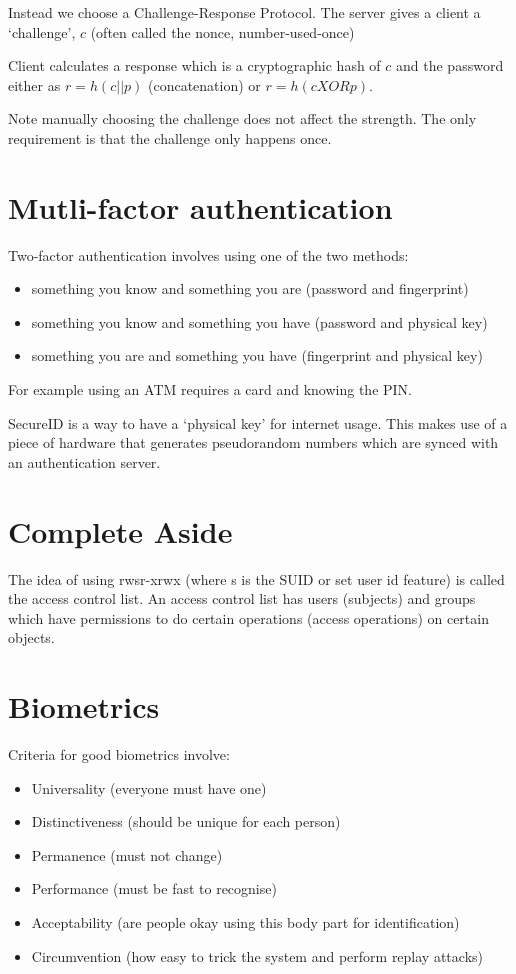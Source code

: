 \documentclass{report}
\begin{document}
Instead we choose a Challenge-Response Protocol.
The server gives a client a `challenge', $c$
(often called the nonce, number-used-once)

Client calculates a response which is a cryptographic hash of $c$
and the password
either as $r = h(c||p)$ (concatenation) or $r = h(c XOR p)$.

Note manually choosing the challenge does not affect the strength. The only
requirement is that the challenge only happens once.

\section{Mutli-factor authentication}
Two-factor authentication involves using one of the two methods:
\begin{itemize}
    \item something you know and something you are (password and fingerprint)
    \item something you know and something you have (password and physical key)
    \item something you are and something you have
        (fingerprint and physical key)
\end{itemize}

For example using an ATM requires a card and knowing the PIN\@.

SecureID is a way to have a `physical key' for internet usage. This makes use of
a piece of hardware that generates pseudorandom numbers which are synced with an
authentication server.

\section{Complete Aside}
The idea of using rwsr-xrwx (where s is the SUID or set user id feature) is
called the access control list. An access control list has users (subjects)
and groups which have permissions to do certain operations (access operations)
on certain objects.

\section{Biometrics}
Criteria for good biometrics involve:
\begin{itemize}
    \item Universality (everyone must have one)
    \item Distinctiveness (should be unique for each person)
    \item Permanence (must not change)
    \item Performance (must be fast to recognise)
    \item Acceptability (are people okay using this body part for identification)
    \item Circumvention (how easy to trick the system and perform replay attacks)
\end{itemize}
\end{document}
